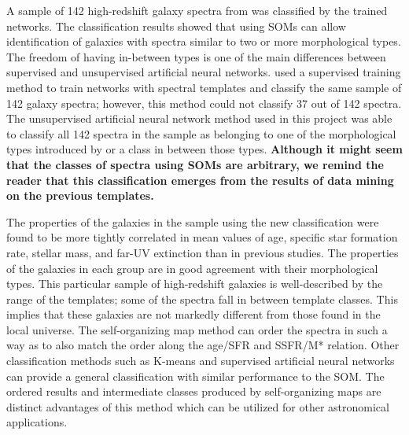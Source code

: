 \documentclass[useAMS,usenatbib]{mn2e}
\begin{document}
    A sample of 142 high-redshift galaxy spectra from  was classified by the trained networks.
    The classification results showed that using SOMs can allow identification of galaxies with spectra similar to two or more morphological types.
    The freedom of having in-between types is one of the main differences between supervised and unsupervised artificial neural networks.
     used a supervised training method to train networks with  spectral templates and classify the same sample of 142 galaxy spectra;
    however, this method could not classify 37 out of 142 spectra.
    The unsupervised artificial neural network method used in this project was able to classify  all 142 spectra in the sample
    as belonging to one of the morphological types introduced by  or a class in between those types.
    \textbf{Although it might seem that the classes of spectra using SOMs are arbitrary, we remind the reader that this classification emerges from the results of data mining on the previous templates.}


    The properties of the galaxies in the  sample using the new classification were found to be more tightly correlated in mean values of age, specific star formation rate, stellar mass, and far-UV extinction than in previous studies. 
    The properties of the galaxies in each group are in good agreement with their morphological types.
    This particular sample of high-redshift galaxies is well-described by the range of the  templates; some of the spectra fall in between template classes. 
    This implies that these galaxies are not markedly different from those found in the local universe.
    The self-organizing map method can order the spectra in such a way as to also match the order along the age/SFR and SSFR/M* relation.
     Other classification methods such as K-means and supervised artificial neural networks can provide a general classification with similar performance to the SOM. The ordered results and intermediate classes produced by self-organizing maps are distinct advantages of this method which can be utilized for other astronomical applications.
\end{document}

